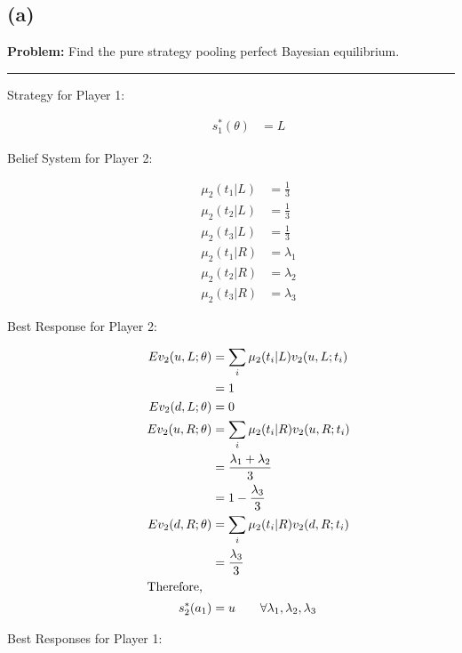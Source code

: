 \documentclass[10pt]{extarticle}
\begin{document}
    \subsection{(a)}%
    \textbf{Problem:} Find the pure strategy pooling perfect Bayesian equilibrium.
    \begin{center}
    \rule{\textwidth}{0.4pt}
    \end{center}
    \begin{description}
      \item[Strategy for Player 1:]
        \begin{align*}
          s_1^{\ast}(\theta) &= L \tag*{$\forall \theta$}
        \end{align*}
      \item[Belief System for Player 2:]
        \begin{align*}
          \mu_2(t_1|L) &= \frac{1}{3}\\
          \mu_2(t_2|L) &= \frac{1}{3}\\
          \mu_2(t_3|L) &= \frac{1}{3}\\
          \mu_2(t_1|R) &= \lambda_1\\
          \mu_2(t_2|R) &= \lambda_2\\
          \mu_2(t_3|R) &= \lambda_3
        \end{align*}
      \item[Best Response for Player 2:]
        \begin{align*}
          Ev_2(u,L;\theta) &= \sum_{i} \mu_2(t_i|L)v_2(u,L;t_i)\\
                           &= 1\\
          Ev_2(d,L;\theta) &= 0\\
          Ev_2(u,R;\theta) &= \sum_{i}\mu_2(t_i|R)v_2(u,R;t_i)\\
                           &= \frac{\lambda_1 + \lambda_2}{3}\\
                           &= 1-\frac{\lambda_3}{3}\\
          Ev_2(d,R;\theta) &= \sum_{i}\mu_2(t_i|R)v_2(d,R;t_i)\\
                           &= \frac{\lambda_3}{3}\\
                           \shortintertext{Therefore,}
          s_2^{\ast}(a_1) &= u \tag*{$\forall \lambda_1,\lambda_2,\lambda_3$}
        \end{align*}
      \item[Best Responses for Player 1:]\hfill
        \begin{description}

\end{description}
\end{description}
\end{document}
